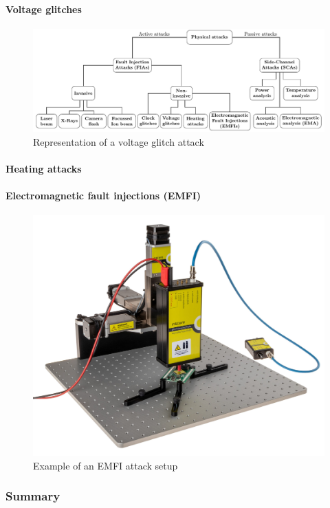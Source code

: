 \paragraph{Voltage glitches}

\begin{figure}[ht]
    \centering
    \includegraphics[page=6, scale=1.25]{c2_soa/img/physicalAttacks.pdf}
    \caption{Representation of a voltage glitch attack}
    \label{fig:voltage_glitch}
\end{figure}


\paragraph{Heating attacks}

\paragraph{Electromagnetic fault injections (EMFI)}

\begin{figure}[ht]
    \centering
    \includegraphics[width=.5\textwidth]{c2_soa/img/emfi_riscure_setup.jpg}
    \caption{Example of an EMFI attack setup}
    \label{fig:emfi_setup}
\end{figure}

\subsubsection{Summary}

